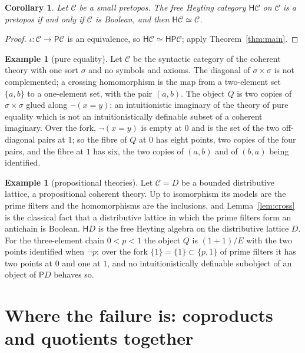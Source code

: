 \documentclass[11pt]{amsart}
\newtheorem{cor}[thm]{Corollary}
\theoremstyle{definition}
\newtheorem{ex}[thm]{Example}
\newcommand{\PP}{\mathsf P}
\newcommand{\HH}{\mathsf H}
\newcommand{\cC}{\mathcal C}
\begin{document}
\begin{cor}\label{cor:pretopos}
Let $\cC$ be a small pretopos. The free Heyting category $\HH\cC$ on
$\cC$ is a pretopos if and only if $\cC$ is Boolean, and then
$\HH\cC\simeq\cC$.
\end{cor}
\begin{proof}
$\iota\colon\cC\to\PP\cC$ is an equivalence, so $\HH\cC\simeq\HH\PP\cC$;
apply Theorem~\ref{thm:main}.
\end{proof}

\begin{ex}[pure equality]\label{ex:eq}
Let $\cC$ be the syntactic category of the coherent theory with one
sort $\sigma$ and no symbols and axioms. The diagonal of $\sigma\times
\sigma$ is not complemented; a crossing homomorphism is the map from a
two-element set $\{a,b\}$ to a one-element set, with the pair $(a,b)$.
The object $Q$ is two copies of $\sigma\times\sigma$ glued along
$\neg(x=y)$: an intuitionistic imaginary of the theory of pure
equality which is not an intuitionistically definable subset of a
coherent imaginary. Over the fork, $\neg(x=y)$ is empty at $0$ and is
the set of the two off-diagonal pairs at $1$; so the fibre of $Q$ at
$0$ has eight points, two copies of the four pairs, and the fibre at
$1$ has six, the two copies of $(a,b)$ and of $(b,a)$ being identified.
\end{ex}

\begin{ex}[propositional theories]\label{ex:prop}
Let $\cC=D$ be a bounded distributive lattice, a propositional coherent
theory. Up to isomorphism its models are the prime filters and the
homomorphisms are the inclusions, and Lemma~\ref{lem:cross} is the classical fact that a
distributive lattice in which the prime filters form an antichain is
Boolean. $\HH D$ is the free Heyting algebra on the distributive
lattice $D$. For the three-element chain $0<p<1$ the object $Q$ is
$(1+1)/E$ with the two points identified when $\neg p$; over the fork
$\{1\}=\{1\}\subset\{p,1\}$ of prime filters it has two points at $0$
and one at $1$, and no intuitionistically definable subobject of an
object of $\PP D$ behaves so.
\end{ex}

\section{Where the failure is: coproducts and quotients together}
\end{document}
